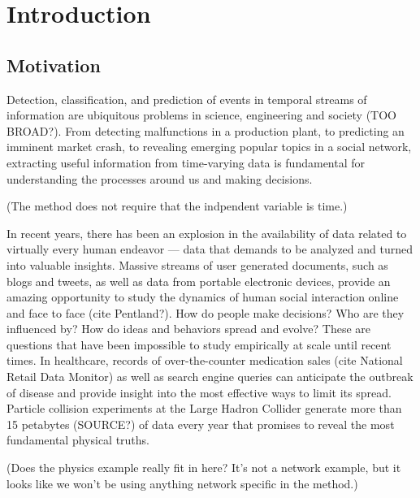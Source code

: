 \chapter{Introduction}
\section{Motivation}
Detection, classification, and prediction of events in temporal streams of information are ubiquitous problems in science, engineering and society (TOO BROAD?). From detecting malfunctions in a production plant, to predicting an imminent market crash, to revealing emerging popular topics in a social network, extracting useful information from time-varying data is fundamental for understanding the processes around us and making decisions.

(The method does not require that the indpendent variable is time.)

In recent years, there has been an explosion in the availability of data related to virtually every human endeavor --- data that demands to be analyzed and turned into valuable insights. Massive streams of user generated documents, such as blogs and tweets, as well as data from portable electronic devices, provide an amazing opportunity to study the dynamics of human social interaction online and face to face (cite Pentland?). How do people make decisions? Who are they influenced by? How do ideas and behaviors spread and evolve? These are questions that have been impossible to study empirically at scale until recent times. In healthcare, records of over-the-counter medication sales (cite National Retail Data Monitor) as well as search engine queries can anticipate the outbreak of disease and provide insight into the most effective ways to limit its spread. Particle collision experiments at the Large Hadron Collider generate more than 15 petabytes (SOURCE?) of data every year that promises to reveal the most fundamental physical truths.

(Does the physics example really fit in here? It's not a network example, but it looks like we won't be using anything network specific in the method.)


